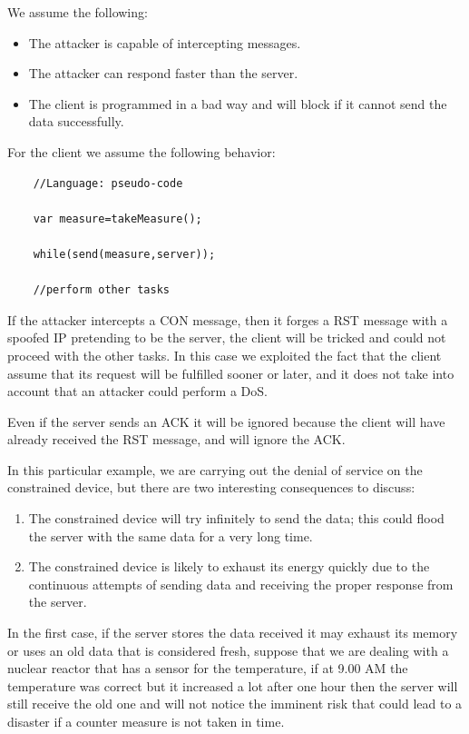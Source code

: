 	We assume the following:
	\begin{itemize}
		\item The attacker is capable of intercepting messages.
		\item The attacker can respond faster than the server.
		\item The client is programmed in a bad way and will block if it cannot send the data successfully.
	\end{itemize}

	For the client we assume the following behavior:
	\begin{lstlisting}
	//Language: pseudo-code
	
	var measure=takeMeasure();
	
	while(send(measure,server));
	
	//perform other tasks
	\end{lstlisting}
	
	If the attacker intercepts a CON message, then it forges a RST message with a spoofed IP pretending to be the server, the client will be tricked and could not proceed with the other tasks.\newline
	In this case we exploited the fact that the client assume that its request will be fulfilled sooner or later, and it does not take into account that an attacker could perform a DoS.\newline
	
	Even if the server sends an ACK it will be ignored because the client will have already received the RST message, and will ignore the ACK.\newline
	
	In this particular example, we are carrying out the denial of service on the constrained device, but there are two interesting consequences to discuss:
	\begin{enumerate}
		\item The constrained device will try infinitely to send the data; this could flood the server with the same data for a very long time.
		\item The constrained device is likely to exhaust its energy quickly due to the continuous attempts of sending data and receiving the proper response from the server.
	\end{enumerate}

	In the first case, if the server stores the data received it may exhaust its memory or uses an old data that is considered fresh, suppose that we are dealing with a nuclear reactor that has a sensor for the temperature, if at 9.00 AM the temperature was correct but it increased a lot after one hour then the server will still receive the old one and will not notice the imminent risk that could lead to a disaster if a counter measure is not taken in time.\newline
	

